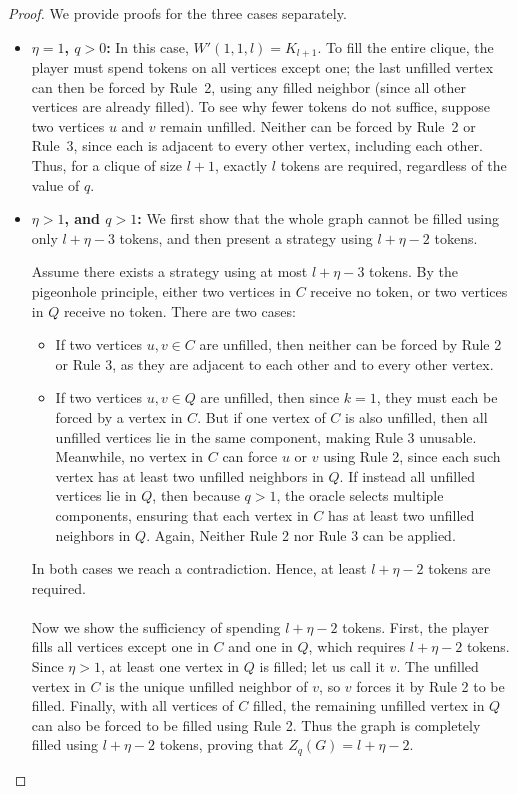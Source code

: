 \documentclass[11pt]{article}
\theoremstyle{plain}
\theoremstyle{definition}
\theoremstyle{remark}
\begin{document}
\begin{proof}
We provide proofs for the three cases separately.

\begin{itemize}
    \item \textbf{$\eta = 1$, $q > 0$:}  
    In this case, $W'(1,1,l) = K_{l+1}$. To fill the entire clique, the player must spend tokens on all vertices except one; the last unfilled vertex can then be forced by Rule~2, using any filled neighbor (since all other vertices are already filled).  
    To see why fewer tokens do not suffice, suppose two vertices $u$ and $v$ remain unfilled. Neither can be forced by Rule~2 or Rule~3, since each is adjacent to every other vertex, including each other. Thus, for a clique of size $l+1$, exactly $l$ tokens are required, regardless of the value of $q$.

    \item \textbf{$\eta > 1$, and $q > 1$:}  
    We first show that the whole graph cannot be filled using only $l + \eta - 3$ tokens, and then present a strategy using $l + \eta - 2$ tokens.

    Assume there exists a strategy using at most $l + \eta - 3$ tokens. By the pigeonhole principle, either two vertices in $C$ receive no token, or two vertices in $Q$ receive no token. There are two cases:

    \begin{itemize}
        \item If two vertices $u,v \in C$ are unfilled, then neither can be forced by Rule 2 or Rule 3, as they are adjacent to each other and to every other vertex. \\ 

        \item If two vertices $u,v \in Q$ are unfilled, then since $k=1$, they must each be forced by a vertex in $C$. But if one vertex of $C$ is also unfilled, then all unfilled vertices lie in the same component, making Rule 3 unusable. Meanwhile, no vertex in $C$ can force $u$ or $v$ using Rule 2, since each such vertex has at least two unfilled neighbors in $Q$. If instead all unfilled vertices lie in $Q$, then because $q>1$, the oracle selects multiple components, ensuring that each vertex in $C$ has at least two unfilled neighbors in $Q$. Again, Neither Rule 2 nor Rule 3 can be applied.  
    \end{itemize}
    In both cases we reach a contradiction. Hence, at least $l+\eta-2$ tokens are required.\\\\
    Now we show the sufficiency of spending $l+\eta-2$ tokens. First, the player fills all vertices except one in $C$ and one in $Q$, which requires $l+\eta-2$ tokens. Since $\eta > 1$, at least one vertex in $Q$ is filled; let us call it $v$. The unfilled vertex in $C$ is the unique unfilled neighbor of $v$, so $v$ forces it by Rule 2 to be filled. Finally, with all vertices of $C$ filled, the remaining unfilled vertex in $Q$ can also be forced to be filled using Rule 2. Thus the graph is completely filled using $l + \eta - 2$ tokens, proving that $Z_q(G) = l + \eta - 2$.


\end{itemize}
\end{proof}
\end{document}

